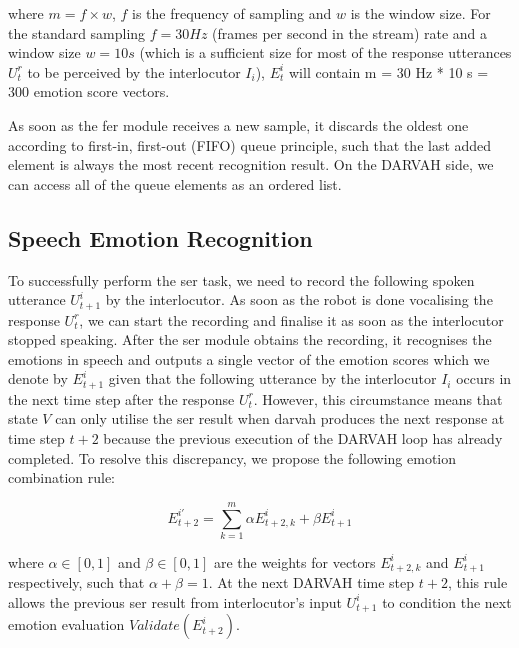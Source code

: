 where \(m = f \times w\), \( f\) is the frequency of sampling and \( w\) is the window size. For the standard sampling \(f = 30 Hz\) (frames per second in the stream) rate and a window size \(w = 10 s \) (which is a sufficient size for most of the response utterances \( U_t^r\) to be perceived by the interlocutor \( I_i\)), \( E_t^i \) will contain m = 30 Hz * 10 s = 300 emotion score vectors.

As soon as the \acrshort{fer} module receives a new sample, it discards the oldest one according to first-in, first-out (FIFO) queue principle, such that the last added element is always the most recent recognition result. On the DARVAH side, we can access all of the queue elements as an ordered list.

\subsection{Speech Emotion Recognition}

To successfully perform the \acrshort{ser} task, we need to record the following spoken utterance \( U_{t+1}^i\) by the interlocutor. As soon as the robot is done vocalising the response \( U_t^r\), we can start the recording and finalise it as soon as the interlocutor stopped speaking. After the \acrshort{ser} module obtains the recording, it recognises the emotions in speech and outputs a single vector of the emotion scores which we denote by \( E_{t+1}^i \) given that the following utterance by the interlocutor \( I_i\) occurs in the next time step after the response \( U_t^r\). However, this circumstance means that state \( V\) can only utilise the \acrshort{ser} result when \acrshort{darvah} produces the next response at time step \( t+2\) because the previous execution of the DARVAH loop has already completed.
To resolve this discrepancy, we propose the following emotion combination rule:

$$ 
E_{t+2}^{i'} = \sum_{k=1}^{m}{\alpha E_{t+2,k}^i + \beta E_{t+1}^i}
$$

where \( \alpha \in [0, 1]\) and \( \beta \in [0, 1]\) are the weights for vectors \( E_{t+2,k}^i \) and \( E_{t+1}^i \) respectively, such that \( \alpha + \beta = 1\). At the next DARVAH time step \( t+2\), this rule allows the previous \acrlong{ser} result from interlocutor's input \( U_{t+1}^i\) to condition the next emotion evaluation \(Validate(E_{t+2}^{i})\).